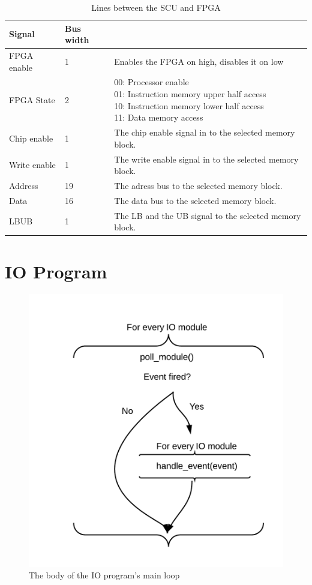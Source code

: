 \begin{table}
    \begin{tabular}{| l | l | l |}
        \hline
        Signal & Bus width & \\
        \hline
        FPGA enable & 1 & Enables the FPGA on high, disables it on low\\
        \hline
        FPGA State & 2 & \pbox{20cm}{00: Processor enable\\01: Instruction memory upper half access\\10: Instruction memory lower half access\\11: Data memory access}\\
        \hline
        Chip enable & 1 & The chip enable signal in to the selected memory block.\\
        \hline
        Write enable & 1 & The write enable signal in to the selected memory block.\\
        \hline
        Address & 19 & The adress bus to the selected memory block.\\
        \hline
        Data & 16 & The data bus to the selected memory block.\\
        \hline
        LBUB & 1 & The LB and the UB signal to the selected memory block.\\
        \hline
    \end{tabular}
    \caption{Lines between the SCU and FPGA}
\end{table}

\section{IO Program}
\begin{figure}[H]
    \includegraphics[width=\textwidth]{io/fig/program.png}
    \caption{The body of the IO program's main loop}
\end{figure}


